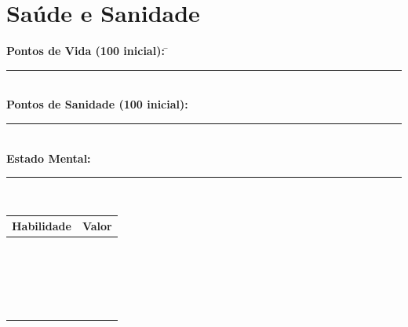\documentclass[a4paper,12pt]{article}
\begin{document}
\section*{Saúde e Sanidade}
\begin{tabbing}
    \textbf{Pontos de Vida (100 inicial):} \hspace{2cm} \= \rule{3cm}{0.4pt} \\
    \textbf{Pontos de Sanidade (100 inicial):} \> \rule{3cm}{0.4pt} \\
    \textbf{Estado Mental:} \> \rule{10cm}{0.4pt} \\
\end{tabbing}
\begin{multicols}{2}

   \begin{center}
        \begin{tabular}{|m{6cm}|c|}
            \hline
            \textbf{Habilidade} & \textbf{Valor} \\
            \hline
            & \\
            \hline
            & \\
            \hline
            & \\
            \hline
            & \\
            \hline
            & \\
            \hline
            & \\
            \hline
            & \\
            \hline
            & \\
            \hline
            & \\
            \hline
            & \\
            \hline
            & \\
            \hline
            & \\
            \hline
                        & \\
            \hline
                        & \\
            \hline
                        & \\
            \hline
                        & \\
            \hline
                        & \\
            \hline
                        & \\
            \hline
                        & \\
            \hline
                        & \\

\end{tabular}
\end{center}
\end{multicols}
\end{document}
